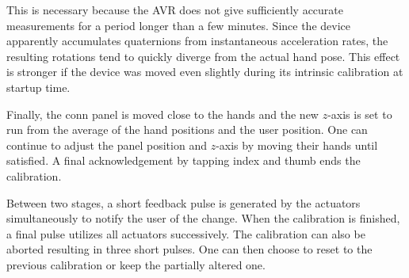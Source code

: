\documentclass[hyperref, bachelorofscience]{cgvpub}
\begin{document}
This is necessary because the \Gls{AVR} does not give sufficiently accurate measurements for a period longer than a few minutes. Since the device apparently accumulates quaternions from instantaneous acceleration rates, the resulting rotations tend to quickly diverge from the actual hand pose. This effect is stronger if the device was moved even slightly during its intrinsic calibration at startup time.

Finally, the conn panel is moved close to the hands and the new $ z $-axis is set to run from the average of the hand positions and the user position. One can continue to adjust the panel position and $ z $-axis by moving their hands until satisfied. A final acknowledgement by tapping index and thumb ends the calibration.

Between two stages, a short feedback pulse  is generated by the actuators simultaneously to notify the user of the change. When the calibration is finished, a final pulse utilizes all actuators successively. The calibration can also be aborted resulting in three short pulses. One can then choose to reset to the previous calibration or keep the partially altered one.

\printglossary[type=gloss_terms]
\printglossary[type=gloss_acr]
\end{document}
